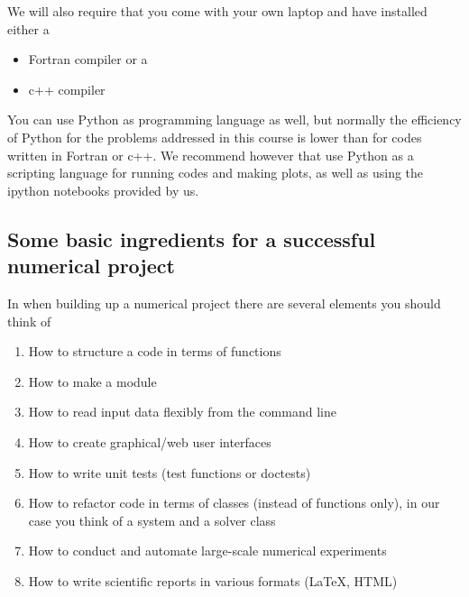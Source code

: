 \documentclass[%
twoside,                 %
final,                   %
10pt]{article}
\begin{document}
We will also require that you come with your own laptop and have installed either a
\begin{itemize}
\item Fortran compiler or a 

\item c++ compiler
\end{itemize}

\noindent
You can use Python as programming language as well, but normally the efficiency of Python for the problems addressed in this course is lower than for codes written in Fortran or c++. We recommend however that use Python as a scripting language for running codes and making plots, as well as using the ipython notebooks provided by us.  

\subsection*{Some basic ingredients for a successful numerical project}

In when building up a numerical project there are several elements you should think of
\begin{enumerate}
  \item How to structure a code in terms of functions

  \item How to make a module

  \item How to read input data flexibly from the command line

  \item How to create graphical/web user interfaces

  \item How to write unit tests (test functions or doctests)

  \item How to refactor code in terms of classes (instead of functions only), in our case you think of a system and a solver class

  \item How to conduct and automate large-scale numerical experiments

  \item How to write scientific reports in various formats ({\LaTeX}, HTML)
\end{enumerate}
\end{document}
